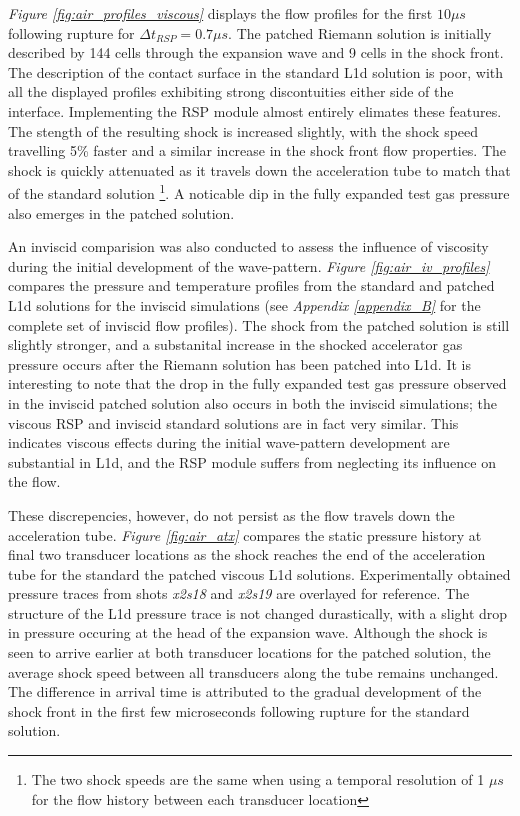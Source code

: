 \documentclass[a4paper,10pt]{article}
\begin{document}
\emph{Figure \ref{fig:air_profiles_viscous}} displays the flow profiles for the first $10 \mu s$ following rupture for $\Delta t_{RSP} = 0.7 \mu s$.  The patched Riemann solution is initially described by 144 cells through the expansion wave and 9 cells in the shock front.  The description of the contact surface in the standard L1d solution is poor, with all the displayed profiles exhibiting strong discontuities either side of the interface.  Implementing the RSP module almost entirely elimates these features.  The stength of the resulting shock is increased slightly, with the shock speed travelling 5\% faster and a similar increase in the shock front flow properties.  The shock is quickly attenuated as it travels down the acceleration tube to match that of the standard solution \footnote{The two shock speeds are the same when using a temporal resolution of 1 $\mu s$ for the flow history between each transducer location}.  A noticable dip in the fully expanded test gas pressure also emerges in the patched solution.

\par \medskip

An inviscid comparision was also conducted to assess the influence of viscosity during the initial development of the wave-pattern.  \emph{Figure \ref{fig:air_iv_profiles}} compares the pressure and temperature profiles from the standard and patched L1d solutions for the inviscid simulations (see \emph{Appendix \ref{appendix_B}} for the complete set of inviscid flow profiles).  The shock from the patched solution is still slightly stronger, and a substanital increase in the shocked accelerator gas pressure occurs after the Riemann solution has been patched into L1d.  It is interesting to note that the drop in the fully expanded test gas pressure observed in the inviscid patched solution also occurs in both the inviscid simulations; the viscous RSP and inviscid standard solutions are in fact very similar.  This indicates viscous effects during the initial wave-pattern development are substantial in L1d, and the RSP module suffers from neglecting its influence on the flow.

\par \medskip

These discrepencies, however, do not persist as the flow travels down the acceleration tube.  \emph{Figure \ref{fig:air_atx}} compares the static pressure history at final two transducer locations as the shock reaches the end of the acceleration tube for the standard the patched viscous L1d solutions.  Experimentally obtained pressure traces from shots \emph{x2s18} and \emph{x2s19} are overlayed for reference.  The structure of the L1d pressure trace is not changed durastically, with a slight drop in pressure occuring at the head of the expansion wave.  Although the shock is seen to arrive earlier at both transducer locations for the patched solution, the average shock speed between all transducers along the tube remains unchanged.  The difference in arrival time is attributed to the gradual development of the shock front in the first few microseconds following rupture for the standard solution.
\end{document}
